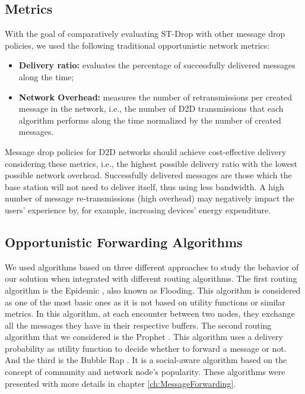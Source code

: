 \subsection{Metrics}

With the goal of comparatively evaluating ST-Drop with other message drop policies, we used the following traditional opportunistic network metrics:

\begin{itemize}
\item \textbf{Delivery ratio:} evaluates the percentage of successfully delivered messages along the time;
\item \textbf{Network Overhead:} measures the number of retransmissions per created message in the network, i.e., the number of D2D transmissions that each algorithm performs along the time normalized by the number of created messages.
\end{itemize}

Message drop policies for D2D networks should achieve cost-effective delivery considering these metrics, i.e., the highest possible delivery ratio with the lowest possible network
overhead. Successfully delivered messages are those which the base station will not need to deliver itself, thus using less bandwidth. A high number of message re-transmissions (high overhead)
may negatively impact the users' experience by, for example, increasing devices' energy expenditure.

\subsection{Opportunistic Forwarding Algorithms}
\label{sec:routingAlgorithms}

We used algorithms based on three different approaches to study the behavior of our solution when integrated with different routing algorithms.
The first routing algorithm is the Epidemic \cite{vahdat2000epidemic}, also known as Flooding. This algorithm is considered as one of the most basic ones
as it is not based on utility functions or similar metrics. In this algorithm, at each encounter between two nodes, they exchange all the messages they have in their respective buffers.
The second routing algorithm that we considered is the Prophet \cite{lindgren2003probabilistic}. This algorithm uses a delivery probability as utility function to decide whether to
forward a message or not. And the third is the Bubble Rap \cite{hui2011bubble}. It is a social-aware algorithm based on the concept of community and network node's popularity.
These algorithms were presented with more details in chapter \ref{ch:MessageForwarding}.

